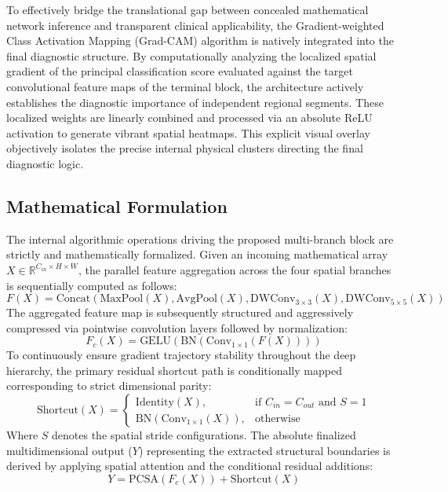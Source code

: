 \documentclass[]{elsarticle}
\begin{document}
To effectively bridge the translational gap between concealed mathematical network inference and transparent clinical applicability, the Gradient-weighted Class Activation Mapping (Grad-CAM) algorithm is natively integrated into the final diagnostic structure. By computationally analyzing the localized spatial gradient of the principal classification score evaluated against the target convolutional feature maps of the terminal block, the architecture actively establishes the diagnostic importance of independent regional segments. These localized weights are linearly combined and processed via an absolute ReLU activation to generate vibrant spatial heatmaps. This explicit visual overlay objectively isolates the precise internal physical clusters directing the final diagnostic logic.


\subsection{Mathematical Formulation}
The internal algorithmic operations driving the proposed multi-branch block are strictly and mathematically formalized. Given an incoming mathematical array $X \in \mathbb{R}^{C_{in} \times H \times W}$, the parallel feature aggregation across the four spatial branches is sequentially computed as follows:
\begin{equation}
F(X) = \text{Concat}(\text{MaxPool}(X), \text{AvgPool}(X), \text{DWConv}_{3\times3}(X), \text{DWConv}_{5\times5}(X))
\end{equation}
The aggregated feature map is subsequently structured and aggressively compressed via pointwise convolution layers followed by normalization:
\begin{equation}
F_c(X) = \text{GELU}(\text{BN}(\text{Conv}_{1\times1}(F(X))))
\end{equation}
To continuously ensure gradient trajectory stability throughout the deep hierarchy, the primary residual shortcut path is conditionally mapped corresponding to strict dimensional parity:
\begin{equation}
\text{Shortcut}(X) = 
\begin{cases} 
\text{Identity}(X), & \text{if } C_{in} = C_{out} \text{ and } S=1 \\
\text{BN}(\text{Conv}_{1\times1}(X)), & \text{otherwise}
\end{cases}
\end{equation}
Where $S$ denotes the spatial stride configurations. The absolute finalized multidimensional output ($Y$) representing the extracted structural boundaries is derived by applying spatial attention and the conditional residual additions:
\begin{equation}
Y = \text{PCSA}(F_c(X)) + \text{Shortcut}(X)
\end{equation}
\end{document}

